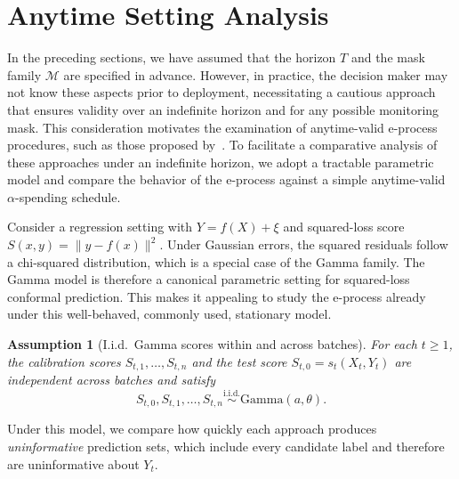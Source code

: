\documentclass{uai2026} %
\newtheorem{assumption}[theorem]{Assumption}
\newcommand{\R}{\mathbb{R}}
\newcommand{\rset}{\R}
\newcommand{\1}{\mathbf{1}}
\newcommand{\ycal}{\mathcal{Y}}
\newcommand{\mcal}{\mathcal{M}}
\begin{document}
\section{Anytime Setting Analysis}
\label{sec:ville}

In the preceding sections, we have assumed that the horizon $T$ and the mask family $\mcal$ are specified in advance. However, in practice, the decision maker may not know these aspects prior to deployment, necessitating a cautious approach that ensures validity over an indefinite horizon and for any possible monitoring mask. This consideration motivates the examination of anytime-valid e-process procedures, such as those proposed by~\citet{gauthier2025values}. To facilitate a comparative analysis of these approaches under an indefinite horizon, we adopt a tractable parametric model and compare the behavior of the e-process against a simple anytime-valid $\alpha$-spending schedule.

Consider a regression setting with $Y = f(X) + \xi$ and squared-loss score $S(x,y) = \|y-f(x)\|^2$.
Under Gaussian errors, the squared residuals follow a chi-squared distribution, which is a special case of the Gamma family.
The Gamma model is therefore a canonical parametric setting for squared-loss conformal prediction. This makes it appealing to study the e-process already under this well-behaved, commonly used,  stationary model.


\begin{assumption}[I.i.d.\ Gamma scores within and across batches]
  \label{ass:gamma-scores}
  For each $t\ge 1$, the calibration scores $S_{t,1}, \dots, S_{t,n}$ and the test score $S_{t,0} = s_t(X_t, Y_t)$ are independent across batches and  satisfy
  \begin{equation*}
    S_{t,0}, S_{t,1}, \ldots, S_{t,n} \stackrel{\text{i.i.d.}}{\sim} \mathrm{Gamma}(a, \theta).
  \end{equation*}
\end{assumption}

Under this model, we compare how quickly each approach produces \emph{uninformative} prediction sets, which include every candidate label and therefore are uninformative about $Y_t$.
\end{document}
